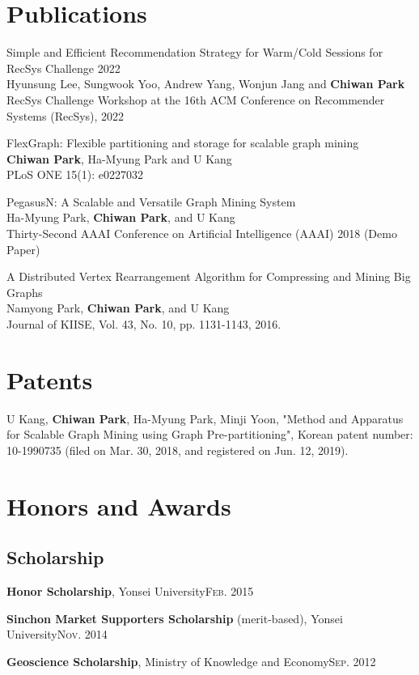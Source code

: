 \documentclass[11pt,a4paper]{article}
\renewenvironment{itemize}{
  \begin{list}{}{
    \setlength{\leftmargin}{1.5em}
    \setlength{\itemsep}{0.5em}
    \setlength{\parskip}{0pt}
    \setlength{\parsep}{0.25em}
  }
}{
  \end{list}
}
\begin{document}
\section*{Publications}
\begin{itemize}
  \item Simple and Efficient Recommendation Strategy for Warm/Cold Sessions for RecSys Challenge 2022\\
  Hyunsung Lee, Sungwook Yoo, Andrew Yang, Wonjun Jang and \textbf{Chiwan Park}\\
  RecSys Challenge Workshop at the 16th ACM Conference on Recommender Systems (RecSys), 2022
  \item FlexGraph: Flexible partitioning and storage for scalable graph mining\\
  \textbf{Chiwan Park}, Ha-Myung Park and U Kang\\
  PLoS ONE 15(1): e0227032
  \item PegasusN: A Scalable and Versatile Graph Mining System\\
  Ha-Myung Park, \textbf{Chiwan Park}, and U Kang\\
  Thirty-Second AAAI Conference on Artificial Intelligence (AAAI) 2018 (Demo Paper)
  \item A Distributed Vertex Rearrangement Algorithm for Compressing and Mining Big Graphs\\
  Namyong Park, \textbf{Chiwan Park}, and U Kang\\
  Journal of KIISE, Vol. 43, No. 10, pp. 1131-1143, 2016.
\end{itemize}

\section*{Patents}
\begin{itemize}
  \item U Kang, \textbf{Chiwan Park}, Ha-Myung Park, Minji Yoon, "Method and Apparatus for Scalable Graph Mining using Graph Pre-partitioning", Korean patent number: 10-1990735 (filed on Mar. 30, 2018, and registered on Jun. 12, 2019).
\end{itemize}

\section*{Honors and Awards}
\subsection*{Scholarship}
\begin{itemize}
	\setlength\itemsep{0.1em}
  \item \textbf{Honor Scholarship}, Yonsei University\hfill\textsc{Feb. 2015}
  \item \textbf{Sinchon Market Supporters Scholarship} (merit-based), Yonsei University\hfill\textsc{Nov. 2014}
  \item \textbf{Geoscience Scholarship}, Ministry of Knowledge and Economy\hfill\textsc{Sep. 2012}
\end{itemize}
\end{document}
